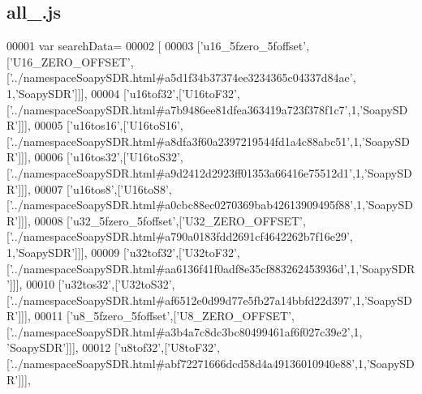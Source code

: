 \subsection{all\+\_.\+js}
\label{all__11_8js_source}

\begin{DoxyCode}
00001 var searchData=
00002 [
00003   [\textcolor{stringliteral}{'u16\_5fzero\_5foffset'},[\textcolor{stringliteral}{'U16\_ZERO\_OFFSET'},[\textcolor{stringliteral}{'../namespaceSoapySDR.html#a5d1f34b37374ee3234365c04337d84ae'},
      1,\textcolor{stringliteral}{'SoapySDR'}]]],
00004   [\textcolor{stringliteral}{'u16tof32'},[\textcolor{stringliteral}{'U16toF32'},[\textcolor{stringliteral}{'../namespaceSoapySDR.html#a7b9486ee81dfea363419a723f378f1c7'},1,\textcolor{stringliteral}{'SoapySDR'}]]],
00005   [\textcolor{stringliteral}{'u16tos16'},[\textcolor{stringliteral}{'U16toS16'},[\textcolor{stringliteral}{'../namespaceSoapySDR.html#a8dfa3f60a2397219544fd1a4c88abc51'},1,\textcolor{stringliteral}{'SoapySDR'}]]],
00006   [\textcolor{stringliteral}{'u16tos32'},[\textcolor{stringliteral}{'U16toS32'},[\textcolor{stringliteral}{'../namespaceSoapySDR.html#a9d2412d2923ff01353a66416e75512d1'},1,\textcolor{stringliteral}{'SoapySDR'}]]],
00007   [\textcolor{stringliteral}{'u16tos8'},[\textcolor{stringliteral}{'U16toS8'},[\textcolor{stringliteral}{'../namespaceSoapySDR.html#a0cbc88ec0270369bab42613909495f88'},1,\textcolor{stringliteral}{'SoapySDR'}]]],
00008   [\textcolor{stringliteral}{'u32\_5fzero\_5foffset'},[\textcolor{stringliteral}{'U32\_ZERO\_OFFSET'},[\textcolor{stringliteral}{'../namespaceSoapySDR.html#a790a0183fdd2691cf4642262b7f16e29'},
      1,\textcolor{stringliteral}{'SoapySDR'}]]],
00009   [\textcolor{stringliteral}{'u32tof32'},[\textcolor{stringliteral}{'U32toF32'},[\textcolor{stringliteral}{'../namespaceSoapySDR.html#aa6136f41f0adf8e35cf883262453936d'},1,\textcolor{stringliteral}{'SoapySDR'}]]],
00010   [\textcolor{stringliteral}{'u32tos32'},[\textcolor{stringliteral}{'U32toS32'},[\textcolor{stringliteral}{'../namespaceSoapySDR.html#af6512e0d99d77e5fb27a14bbfd22d397'},1,\textcolor{stringliteral}{'SoapySDR'}]]],
00011   [\textcolor{stringliteral}{'u8\_5fzero\_5foffset'},[\textcolor{stringliteral}{'U8\_ZERO\_OFFSET'},[\textcolor{stringliteral}{'../namespaceSoapySDR.html#a3b4a7c8dc3bc80499461af6f027c39e2'},1,\textcolor{stringliteral}{
      'SoapySDR'}]]],
00012   [\textcolor{stringliteral}{'u8tof32'},[\textcolor{stringliteral}{'U8toF32'},[\textcolor{stringliteral}{'../namespaceSoapySDR.html#abf72271666dcd58d4a49136010940e88'},1,\textcolor{stringliteral}{'SoapySDR'}]]],

\end{DoxyCode}
